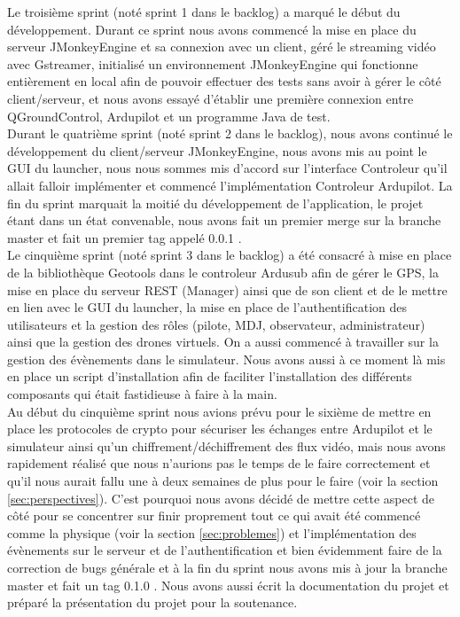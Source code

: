 \documentclass{scrartcl}
\begin{document}
Le troisième sprint (noté sprint 1 dans le backlog) a marqué le début du développement. Durant ce sprint nous avons commencé la mise en place du serveur JMonkeyEngine et sa connexion avec un client,
géré le streaming vidéo avec Gstreamer, initialisé un environnement JMonkeyEngine qui fonctionne entièrement en local afin de pouvoir effectuer des tests sans avoir à gérer le côté client/serveur,
et nous avons essayé d'établir une première connexion entre QGroundControl, Ardupilot et un programme Java de test.\\

Durant le quatrième sprint (noté sprint 2 dans le backlog), nous avons continué le développement du client/serveur JMonkeyEngine, nous avons mis au point le GUI du launcher,
nous nous sommes mis d'accord sur l'interface Controleur qu'il allait falloir implémenter et commencé l'implémentation Controleur Ardupilot. La fin du sprint marquait la moitié du développement de l'application,
le projet étant dans un état convenable, nous avons fait un premier merge sur la branche master et fait un premier tag appelé 0.0.1 .\\

Le cinquième sprint (noté sprint 3 dans le backlog) a été consacré à mise en place de la bibliothèque Geotools dans le controleur Ardusub afin de gérer le GPS, la mise en place du serveur REST (Manager) ainsi que de son client
et de le mettre en lien avec le GUI du launcher, la mise en place de l'authentification des utilisateurs et la gestion des rôles (pilote, MDJ, observateur, administrateur) ainsi que la gestion des drones virtuels. On a aussi commencé
à travailler sur la gestion des évènements dans le simulateur. Nous avons aussi à ce moment là mis en place un script d'installation afin de faciliter l'installation des
différents composants qui était fastidieuse à faire à la main.\\

Au début du cinquième sprint nous avions prévu pour le sixième de mettre en place les protocoles de crypto pour sécuriser les échanges entre Ardupilot et le simulateur ainsi qu'un
chiffrement/déchiffrement des flux vidéo, mais nous avons rapidement réalisé que nous n'aurions pas le temps de le faire correctement et qu'il nous aurait fallu une à deux semaines de plus pour le faire (voir la section \ref{sec:perspectives}).
C'est pourquoi nous avons décidé de mettre cette aspect de côté pour se concentrer sur finir proprement tout ce qui avait été commencé comme la physique (voir la section \ref{sec:problemes}) et l'implémentation
des évènements sur le serveur et de l'authentification et bien évidemment faire de la correction de bugs générale et à la fin du sprint nous avons mis à jour la branche master et fait un tag 0.1.0 . Nous avons aussi écrit la documentation du projet et préparé la présentation du projet pour la soutenance.
\end{document}
